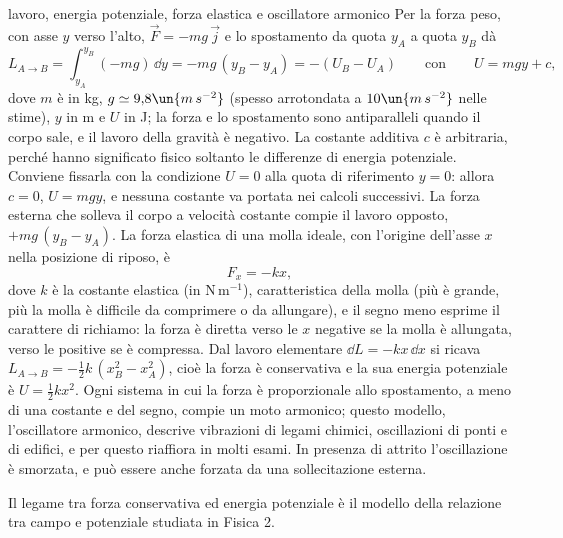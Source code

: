 \documentclass[main.tex]{subfiles}
\begin{document}
\begin{riquadro}{lavoro, energia potenziale, forza elastica e oscillatore armonico}
Per la forza peso, con asse $y$ verso l'alto, $\vec F=-mg\,\vec j$ e lo spostamento da quota $y_A$ a quota $y_B$ dà
\[
L_{A\to B}=\int_{y_A}^{y_B}(-mg)\,\dd y=-mg\,(y_B-y_A)=-(U_B-U_A)\qquad\text{con}\qquad U=mgy+c ,
\]
dove $m$ è in kg, $g\simeq9{,}8\un{m\,s^{-2}}$ (spesso arrotondata a $10\un{m\,s^{-2}}$ nelle stime), $y$ in m e $U$ in J; la forza e lo spostamento sono antiparalleli quando il corpo sale, e il lavoro della gravità è negativo. La costante additiva $c$ è arbitraria, perché hanno significato fisico soltanto le differenze di energia potenziale. Conviene fissarla con la condizione $U=0$ alla quota di riferimento $y=0$: allora $c=0$, $U=mgy$, e nessuna costante va portata nei calcoli successivi. La forza esterna che solleva il corpo a velocità costante compie il lavoro opposto, $+mg\,(y_B-y_A)$. La forza elastica di una molla ideale, con l'origine dell'asse $x$ nella posizione di riposo, è
\[
F_x=-kx ,
\]
dove $k$ è la costante elastica (in $\mathrm{N\,m^{-1}}$), caratteristica della molla (più è grande, più la molla è difficile da comprimere o da allungare), e il segno meno esprime il carattere di richiamo: la forza è diretta verso le $x$ negative se la molla è allungata, verso le positive se è compressa. Dal lavoro elementare $\dd L=-kx\,\dd x$ si ricava $L_{A\to B}=-\tfrac12k\,(x_B^2-x_A^2)$, cioè la forza è conservativa e la sua energia potenziale è $U=\tfrac12kx^2$. Ogni sistema in cui la forza è proporzionale allo spostamento, a meno di una costante e del segno, compie un moto armonico; questo modello, l'oscillatore armonico, descrive vibrazioni di legami chimici, oscillazioni di ponti e di edifici, e per questo riaffiora in molti esami. In presenza di attrito l'oscillazione è smorzata, e può essere anche forzata da una sollecitazione esterna.

Il legame tra forza conservativa ed energia potenziale è il modello della relazione tra campo e potenziale studiata in Fisica 2.
\end{riquadro}
\end{document}
